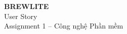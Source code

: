 \documentclass[12pt,a4paper]{article}
\begin{document}
\begin{center}
  {\Large\bfseries BREWLITE}\\[5pt]
  {\large User Story}\\[3pt]
  {Assignment 1 -- Công nghệ Phần mềm}
\end{center}

\vspace{7mm}

\end{document}
